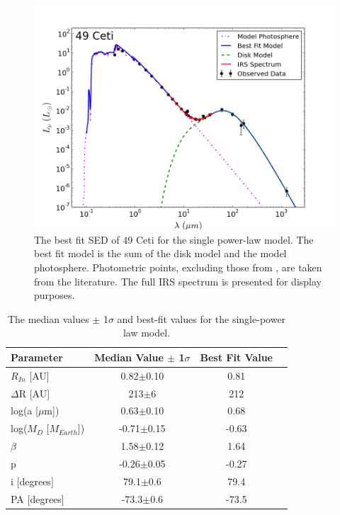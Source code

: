 \begin{figure}[!]
\centering
\includegraphics[width = 1\textwidth]{49CET_Simple_SED.png}
\caption{The best fit SED of 49 Ceti for the single power-law model. The best fit model is the sum of the disk model and the model photosphere. Photometric points, excluding those from \cite{Robe13}, are taken from the literature. The full IRS spectrum is presented for display purposes.}
\label{fig:49CET_Simple_SED}
\end{figure}

\begin{table}[t!]
\begin{center}
    \def\arraystretch{1.10}%
    \begin{tabular}{l*{2}{c}r}
    \hline
     Parameter & Median Value $\pm$ 1$\sigma$ & Best Fit Value \\ \hline
     $R_{In}$  [AU] & 0.82$\pm$0.10 & 0.81\\ 
     $\Delta$R [AU] & 213$\pm$6} & 212 \\ 
     log(a [$\mu$m])  & 0.63$\pm$0.10 & 0.68\\ 
     log($M_{D}$ [$M_{Earth}$])  & -0.71$\pm$0.15 & -0.63\\ 
     $\beta$ & 1.58$\pm$0.12 & 1.64\\ 
     p & -0.26$\pm$0.05 & -0.27\\ 
     i [degrees] & 79.1$\pm$0.6 & 79.4 \\ 
     PA [degrees] & -73.3$\pm$0.6 & -73.5\\
    \hline
    \end{tabular}
\caption{The median values $\pm$ 1$\sigma$ and best-fit values for the single-power law model.}
\label{tab:SimpleModel_Table}
\end{center}
\end{table}



